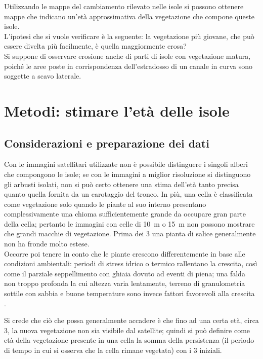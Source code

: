 \bigskip
Utilizzando le mappe del cambiamento rilevato nelle isole si possono ottenere mappe che indicano un'età approssimativa della vegetazione che compone queste isole. 
\\
L'ipotesi che si vuole verificare è la seguente: la vegetazione più giovane, che può essere divelta più facilmente, è quella maggiormente erosa?
\\
Si suppone di osservare erosione anche di parti di isole con vegetazione matura, poiché le aree poste in corrispondenza dell'estradosso di un canale in curva sono soggette a scavo laterale.

\section{Metodi: stimare l'età delle isole}
\label{sec:eta}

\subsection{Considerazioni e preparazione dei dati}
Con le immagini satellitari utilizzate non è possibile distinguere i singoli alberi che compongono le isole; se con le immagini a miglior risoluzione si distinguono gli arbusti isolati, non si può certo ottenere una stima dell'età tanto precisa quanto quella fornita da un carotaggio del tronco.
In più, una cella è classificata come vegetazione solo quando le piante al suo interno presentano complessivamente una chioma sufficientemente grande da occupare gran parte della cella; pertanto le immagini con celle di \SI{10}{\m} o  \SI{15}{\m} non possono mostrare che grandi macchie di vegetazione.
Prima dei \SI{3}{\anni} una pianta di salice generalmente non ha fronde molto estese.
\\
Occorre poi tenere in conto che le piante crescono differentemente in base alle condizioni ambientali: periodi di stress idrico o termico rallentano la crescita, così come il parziale seppellimento con ghiaia dovuto ad eventi di piena; una falda non troppo profonda la cui altezza varia lentamente, terreno di granulometria sottile con sabbia e buone temperature sono invece fattori favorevoli alla crescita .

Si crede che ciò che possa generalmente accadere è che fino ad una certa età, circa \SI{3}{\anni}, la nuova vegetazione non sia visibile dal satellite; quindi si può definire come età della vegetazione presente in una cella la somma della persistenza (il periodo di tempo in cui si osserva che la cella rimane vegetata) con i \SI{3}{\anni} iniziali. 

